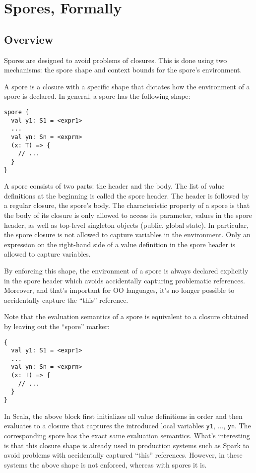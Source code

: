 \appendix
\chapter{Spores, Formally}
\label{appdx:spores-formally}

\section{Overview}

Spores are designed to avoid problems of closures. This is done using two
mechanisms: the spore shape and context bounds for the spore's environment.

A spore is a closure with a specific shape that dictates how the environment of
a spore is declared. In general, a spore has the following shape:

\begin{verbatim}
spore {
  val y1: S1 = <expr1>
  ...
  val yn: Sn = <exprn>
  (x: T) => {
    // ...
  }
}
\end{verbatim}

A spore consists of two parts: the header and the body. The list of value
definitions at the beginning is called the spore header. The header is followed
by a regular closure, the spore's body. The characteristic property of a spore
is that the body of its closure is only allowed to access its parameter, values
in the spore header, as well as top-level singleton objects (public, global
state). In particular, the spore closure is not allowed to capture variables in
the environment. Only an expression on the right-hand side of a value definition
in the spore header is allowed to capture variables.

By enforcing this shape, the environment of a spore is always declared
explicitly in the spore header which avoids accidentally capturing problematic
references. Moreover, and that's important for OO languages, it's no longer
possible to accidentally capture the ``this'' reference.

Note that the evaluation semantics of a spore is equivalent to a closure
obtained by leaving out the ``spore'' marker:

\begin{verbatim}
{
  val y1: S1 = <expr1>
  ...
  val yn: Sn = <exprn>
  (x: T) => {
    // ...
  }
}
\end{verbatim}

In Scala, the above block first initializes all value definitions in order and
then evaluates to a closure that captures the introduced local variables
\verb|y1|, ..., \verb|yn|. The corresponding spore has the exact same evaluation
semantics. What's interesting is that this closure shape is already used in
production systems such as Spark to avoid problems with accidentally captured
``this'' references. However, in these systems the above shape is not enforced,
whereas with spores it is.

